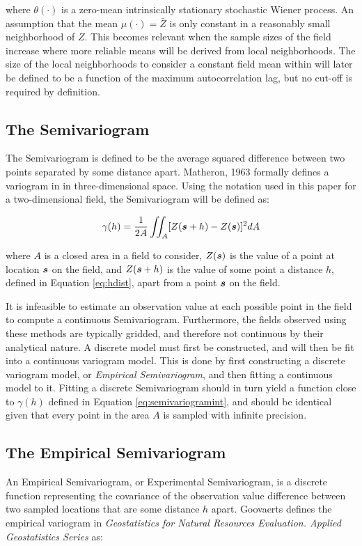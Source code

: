 \noindent where $\theta(\cdot)$ is a zero-mean intrinsically stationary stochastic Wiener process. An assumption that the mean $\mu(\cdot) = \bar{Z}$ is only constant in a reasonably small neighborhood of $Z$. This becomes relevant when the sample sizes of the field increase where more reliable means will be derived from local neighborhoods. The size of the local neighborhoods to consider a constant field mean within will later be defined to be a function of the maximum autocorrelation lag, but no cut-off is required by definition.

\subsection{The Semivariogram}
The Semivariogram is defined to be the average squared difference between two points separated by some distance apart. Matheron, 1963 formally defines a variogram in \cite{matheron:geostat} in three-dimensional space. Using the notation used in this paper for a two-dimensional field, the Semivariogram will be defined as:

\begin{equation}
    \gamma(h) = \frac{1}{2A} \iint_A [ Z({\it{\boldsymbol{s}}} + h) - Z({\it{\boldsymbol{s}}}) ]^2 dA
    \label{eq:semivariogramint}
\end{equation}

\noindent where $A$ is a closed area in a field to consider, $Z({\it{\boldsymbol{s}}})$ is the value of a point at location ${\it{\boldsymbol{s}}}$ on the field, and $Z({\it{\boldsymbol{s}}} + h)$ is the value of some point a distance $h$, defined in Equation \ref{eq:hdist}, apart from a point ${\it{\boldsymbol{s}}}$ on the field.

It is infeasible to estimate an observation value at each possible point in the field to compute a continuous Semivariogram. Furthermore, the fields observed using these methods are typically gridded, and therefore not continuous by their analytical nature. A discrete model must first be constructed, and will then be fit into a continuous variogram model. This is done by first constructing a discrete variogram model, or \textit{Empirical Semivariogram}, and then fitting a continuous model to it. Fitting a discrete Semivariogram should in turn yield a function close to $\gamma(h)$ defined in Equation \ref{eq:semivariogramint}, and should be identical given that every point in the area $A$ is sampled with infinite precision.

\subsection{The Empirical Semivariogram}
An Empirical Semivariogram, or Experimental Semivariogram, is a discrete function representing the covariance of the observation value difference between two sampled locations that are some distance $h$ apart. Goovaerts defines the empirical variogram in \textit{Geostatistics for Natural Resources Evaluation. Applied Geostatistics Series} \cite{goov:97} as:

